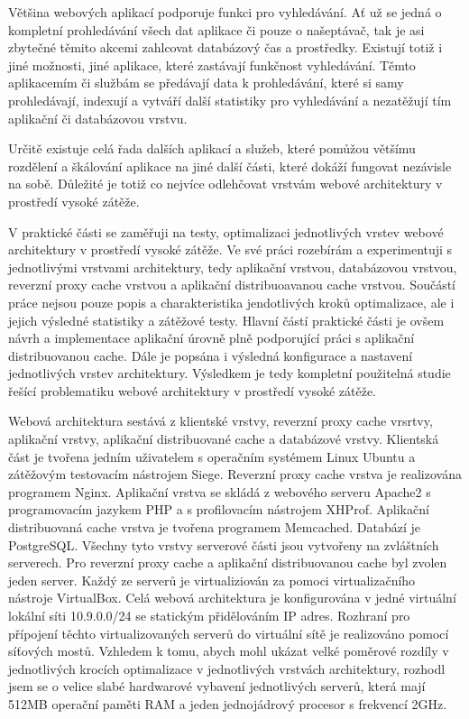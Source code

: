 \documentclass[12pt]{article}
\begin{document}
Většina webových aplikací podporuje funkci pro vyhledávání. Ať už se jedná o kompletní prohledávání všech dat aplikace či pouze o našeptávač, tak je asi zbytečné těmito akcemi zahlcovat databázový čas a prostředky. Existují totiž i jiné možnosti, jiné aplikace, které zastávají funkčnost vyhledávání. Těmto aplikacemím či službám se předávají data k prohledávání, které si samy prohledávají, indexují a vytváří další statistiky pro vyhledávání a nezatěžují tím aplikační či databázovou vrstvu.

Určitě existuje celá řada dalších aplikací a služeb, které pomůžou většímu rozdělení a škálování aplikace na jiné další části, které dokáží fungovat nezávisle na sobě. Důležité je totiž co nejvíce odlehčovat vrstvám webové architektury v prostředí vysoké zátěže.



V praktické části se zaměřuji na testy, optimalizaci jednotlivých vrstev webové architektury v prostředí vysoké zátěže. Ve své práci rozebírám a experimentuji s jednotlivými vrstvami architektury, tedy aplikační vrstvou, databázovou vrstvou, reverzní proxy cache vrstvou a aplikační distribuoavanou cache vrstvou. Součástí práce nejsou pouze popis a charakteristika jendotlivých kroků optimalizace, ale i jejich výsledné statistiky a zátěžové testy. Hlavní částí praktické části je ovšem návrh a implementace aplikační úrovně plně podporující práci s aplikační distribuovanou cache. Dále je popsána i výsledná konfigurace a nastavení jednotlivých vrstev architektury. Výsledkem je tedy kompletní použitelná studie řešící problematiku webové architektury v prostředí vysoké zátěže.

Webová architektura sestává z klientské vrstvy, reverzní proxy cache vrsrtvy, aplikační vrstvy, aplikační distribuované cache a databázové vrstvy. Klientská část je tvořena jedním uživatelem s operačním systémem Linux Ubuntu a zátěžovým testovacím nástrojem Siege. Reverzní proxy cache vrstva je realizována programem Nginx. Aplikační vrstva se skládá z webového serveru Apache2 s programovacím jazykem PHP a s profilovacím nástrojem XHProf. Aplikační distribuovaná cache vrstva je tvořena programem Memcached. Databází je PostgreSQL. Všechny tyto vrstvy serverové části jsou vytvořeny na zvláštních serverech. Pro reverzní proxy cache a aplikační distribuovanou cache byl zvolen jeden server. Každý ze serverů je virtualiziován za pomoci virtualizačního nástroje VirtualBox. Celá webová architektura je konfigurována v jedné virtuální lokální síti 10.9.0.0/24 se statickým přidělováním IP adres. Rozhraní pro přípojení těchto virtualizovaných serverů do virtuální sítě je realizováno pomocí síťových mostů. Vzhledem k tomu, abych mohl ukázat velké poměrové rozdíly v jednotlivých krocích optimalizace v jednotlivých vrstvách architektury, rozhodl jsem se o velice slabé hardwarové vybavení jednotlivých serverů, která mají 512MB operační paměti RAM a jeden jednojádrový procesor s frekvencí 2GHz.
\end{document}
